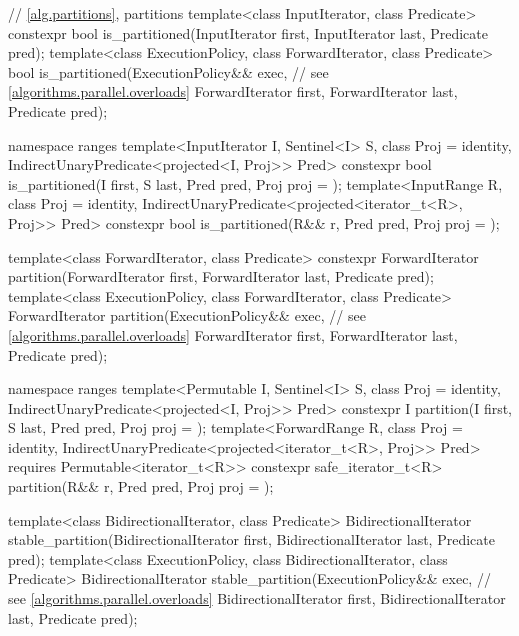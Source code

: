 \begin{codeblock}
{  // \ref{alg.partitions}, partitions
  template<class InputIterator, class Predicate>
    constexpr bool is_partitioned(InputIterator first, InputIterator last, Predicate pred);
  template<class ExecutionPolicy, class ForwardIterator, class Predicate>
    bool is_partitioned(ExecutionPolicy&& exec, // see \ref{algorithms.parallel.overloads}
                        ForwardIterator first, ForwardIterator last, Predicate pred);

  namespace ranges {
    template<InputIterator I, Sentinel<I> S, class Proj = identity,
        IndirectUnaryPredicate<projected<I, Proj>> Pred>
      constexpr bool is_partitioned(I first, S last, Pred pred, Proj proj = {});
    template<InputRange R, class Proj = identity,
        IndirectUnaryPredicate<projected<iterator_t<R>, Proj>> Pred>
      constexpr bool is_partitioned(R&& r, Pred pred, Proj proj = {});
  }

  template<class ForwardIterator, class Predicate>
    constexpr ForwardIterator partition(ForwardIterator first,
                                        ForwardIterator last,
                                        Predicate pred);
  template<class ExecutionPolicy, class ForwardIterator, class Predicate>
    ForwardIterator partition(ExecutionPolicy&& exec, // see \ref{algorithms.parallel.overloads}
                              ForwardIterator first,
                              ForwardIterator last,
                              Predicate pred);

  namespace ranges {
    template<Permutable I, Sentinel<I> S, class Proj = identity,
        IndirectUnaryPredicate<projected<I, Proj>> Pred>
      constexpr I
        partition(I first, S last, Pred pred, Proj proj = {});
    template<ForwardRange R, class Proj = identity,
        IndirectUnaryPredicate<projected<iterator_t<R>, Proj>> Pred>
      requires Permutable<iterator_t<R>>
      constexpr safe_iterator_t<R>
        partition(R&& r, Pred pred, Proj proj = {});
  }

  template<class BidirectionalIterator, class Predicate>
    BidirectionalIterator stable_partition(BidirectionalIterator first,
                                           BidirectionalIterator last,
                                           Predicate pred);
  template<class ExecutionPolicy, class BidirectionalIterator, class Predicate>
    BidirectionalIterator stable_partition(ExecutionPolicy&& exec, // see \ref{algorithms.parallel.overloads}
                                           BidirectionalIterator first,
                                           BidirectionalIterator last,
                                           Predicate pred);

}
\end{codeblock}
